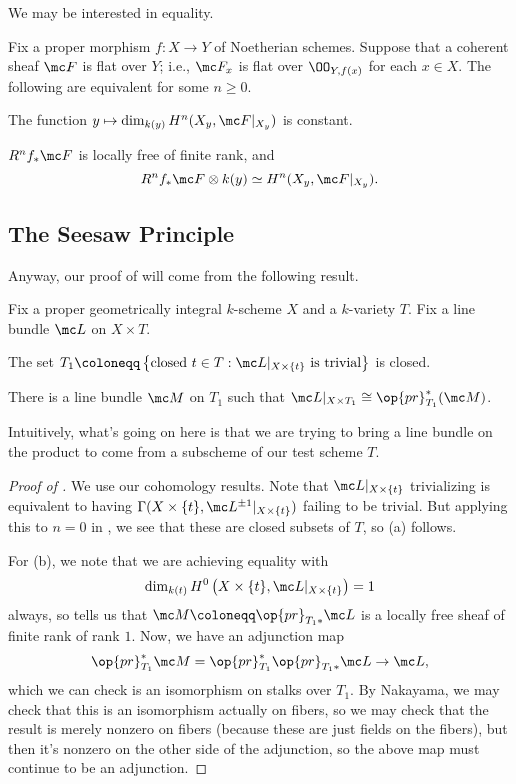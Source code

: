 \documentclass[../notes.tex]{subfiles}
\begin{document}
We may be interested in equality.
\begin{theorem}[Grauert] \label{thm:grauert}
	Fix a proper morphism $f\colon X\to Y$ of Noetherian schemes. Suppose that a coherent sheaf $\mc F$ is flat over $Y$; i.e., $\mc F_x$ is flat over $\OO_{Y,f(x)}$ for each $x\in X$. The following are equivalent for some $n\ge0$.
	\begin{listroman}
		\item The function $y\mapsto\dim_{k(y)}H^n(X_y,\mc F|_{X_y})$ is constant.
		\item $R^nf_*\mc F$ is locally free of finite rank, and
		\[R^nf_*\mc F\otimes k(y)\simeq H^n(X_y,\mc F|_{X_y}).\]
	\end{listroman}
\end{theorem}

\subsection{The Seesaw Principle}
Anyway, our proof of  will come from the following result.
\begin{proposition} \label{prop:seesaw}
	Fix a proper geometrically integral $k$-scheme $X$ and a $k$-variety $T$. Fix a line bundle $\mc L$ on $X\times T$.
	\begin{listalph}
		\item The set $T_1\coloneqq\left\{\text{closed }t\in T:\mc L|_{X\times\{t\}}\text{ is trivial}\right\}$ is closed.
		\item There is a line bundle $\mc M$ on $T_1$ such that $\mc L|_{X\times T_1}\cong\op{pr}_{T_1}^*(\mc M)$.
	\end{listalph}
\end{proposition}
Intuitively, what's going on here is that we are trying to bring a line bundle on the product to come from a subscheme of our test scheme $T$.
\begin{proof}[Proof of ]
	We use our cohomology results. Note that $\mc L|_{X\times\{t\}}$ trivializing is equivalent to having $\Gamma(X\times\{t\},\mc L^{\pm1}|_{X\times\{t\}})$ failing to be trivial. But applying this to $n=0$ in , we see that these are closed subsets of $T$, so (a) follows.

	For (b), we note that we are achieving equality with
	\[\dim_{k(t)}H^0\left(X\times\{t\},\mc L|_{X\times\{t\}}\right)=1\]
	always, so  tells us that $\mc M\coloneqq\op{pr}_{T_1*}\mc L$ is a locally free sheaf of finite rank of rank $1$. Now, we have an adjunction map
	\[\op{pr}_{T_1}^*\mc M=\op{pr}^*_{T_1}\op{pr}_{T_1*}\mc L\to\mc L,\]
	which we can check is an isomorphism on stalks over $T_1$. By Nakayama, we may check that this is an isomorphism actually on fibers, so we may check that the result is merely nonzero on fibers (because these are just fields on the fibers), but then it's nonzero on the other side of the adjunction, so the above map must continue to be an adjunction.
\end{proof}
\end{document}
